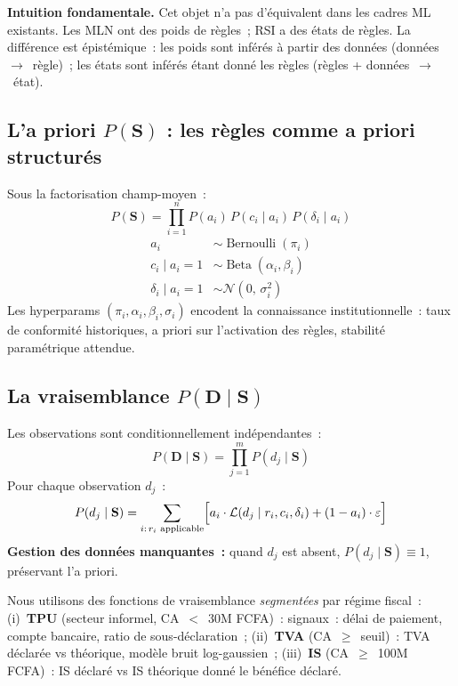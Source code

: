 \documentclass[letterpaper]{article}
\begin{document}
\noindent\textbf{Intuition fondamentale.} Cet objet n'a pas
d'\'equivalent dans les cadres ML existants. Les MLN ont des poids de
r\`egles~; RSI a des \'etats de r\`egles. La diff\'erence est
\'epist\'emique~: les poids sont inf\'er\'es \`a partir des donn\'ees
(donn\'ees~$\to$~r\`egle)~; les \'etats sont inf\'er\'es \'etant donn\'e
les r\`egles (r\`egles + donn\'ees~$\to$~\'etat).

\subsection{L'a priori $P(\mathbf{S})$ : les r\`egles comme a priori structur\'es}

Sous la factorisation champ-moyen~:
\[
  P(\mathbf{S}) = \prod_{i=1}^n P(a_i)\, P(c_i \mid a_i)\, P(\delta_i \mid a_i)
\]
\begin{align}
  a_i &\sim \operatorname{Bernoulli}(\pi_i) \\
  c_i \mid a_i{=}1 &\sim \operatorname{Beta}(\alpha_i, \beta_i) \\
  \delta_i \mid a_i{=}1 &\sim \mathcal{N}(0,\, \sigma_i^2)
\end{align}
Les hyperparams $(\pi_i, \alpha_i, \beta_i, \sigma_i)$ encodent la
connaissance institutionnelle~: taux de conformit\'e historiques,
a priori sur l'activation des r\`egles, stabilit\'e param\'etrique
attendue.

\subsection{La vraisemblance $P(\mathbf{D} \mid \mathbf{S})$}

Les observations sont conditionnellement ind\'ependantes~:
\[
  P(\mathbf{D} \mid \mathbf{S}) = \prod_{j=1}^m P(d_j \mid \mathbf{S})
\]
Pour chaque observation $d_j$~:
\[
  P(d_j \mid \mathbf{S}) = \sum_{i:\, r_i \text{ applicable}}
  \Bigl[a_i \cdot \mathcal{L}(d_j \mid r_i, c_i, \delta_i)
  + (1 - a_i) \cdot \varepsilon\Bigr]
\]
\textbf{Gestion des donn\'ees manquantes~:} quand $d_j$ est absent,
$P(d_j \mid \mathbf{S}) \equiv 1$, pr\'eservant l'a priori.

Nous utilisons des fonctions de vraisemblance \emph{segment\'ees} par
r\'egime fiscal~: (i)~\textbf{TPU} (secteur informel, CA~$<$~30M FCFA)~:
signaux~: d\'elai de paiement, compte bancaire, ratio de
sous-d\'eclaration~; (ii)~\textbf{TVA} (CA~$\geq$~seuil)~: TVA
d\'eclar\'ee vs th\'eorique, mod\`ele bruit log-gaussien~;
(iii)~\textbf{IS} (CA~$\geq$~100M FCFA)~: IS d\'eclar\'e vs IS
th\'eorique donn\'e le b\'en\'efice d\'eclar\'e.
\end{document}
